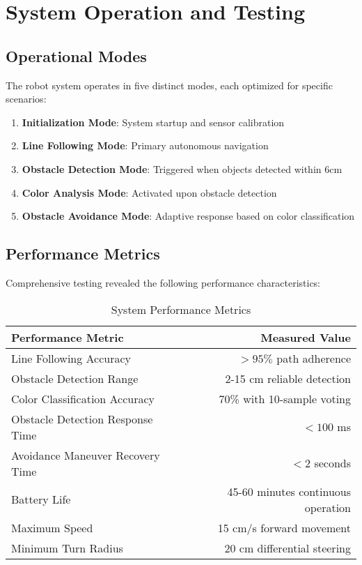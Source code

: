 \documentclass[12pt,a4paper]{article}
\begin{document}
\section{System Operation and Testing}

\subsection{Operational Modes}

The robot system operates in five distinct modes, each optimized for specific scenarios:

\begin{enumerate}
    \item \textbf{Initialization Mode}: System startup and sensor calibration
    \item \textbf{Line Following Mode}: Primary autonomous navigation
    \item \textbf{Obstacle Detection Mode}: Triggered when objects detected within 6cm
    \item \textbf{Color Analysis Mode}: Activated upon obstacle detection
    \item \textbf{Obstacle Avoidance Mode}: Adaptive response based on color classification
\end{enumerate}

\subsection{Performance Metrics}

Comprehensive testing revealed the following performance characteristics:

\begin{table}[H]
\centering
\begin{tabular}{@{}lr@{}}
\toprule
\textbf{Performance Metric} & \textbf{Measured Value} \\
\midrule
Line Following Accuracy & $> 95\%$ path adherence \\
Obstacle Detection Range & 2-15 cm reliable detection \\
Color Classification Accuracy & 70\% with 10-sample voting \\
Obstacle Detection Response Time & $< 100$ ms \\
Avoidance Maneuver Recovery Time & $< 2$ seconds \\
Battery Life & 45-60 minutes continuous operation \\
Maximum Speed & 15 cm/s forward movement \\
Minimum Turn Radius & 20 cm differential steering \\
\bottomrule
\end{tabular}
\caption{System Performance Metrics}
\label{tab:performance}
\end{table}
\end{document}
